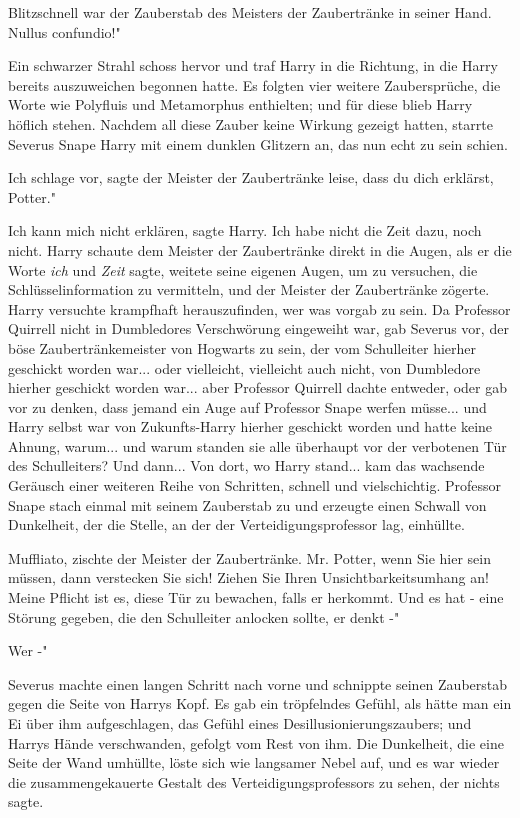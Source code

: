 Blitzschnell war der Zauberstab des Meisters der Zaubertränke in seiner Hand.
\glqq Nullus confundio!"

Ein schwarzer Strahl schoss hervor und traf Harry in die Richtung, in die Harry
bereits auszuweichen begonnen hatte. Es folgten vier weitere Zaubersprüche, die
Worte wie Polyfluis und Metamorphus enthielten; und für diese blieb Harry
höflich stehen. Nachdem all diese Zauber keine Wirkung gezeigt hatten, starrte
Severus Snape Harry mit einem dunklen Glitzern an, das nun echt zu sein schien.

\glqq Ich schlage vor\grqq{}, sagte der Meister der Zaubertränke leise, \glqq
dass du dich erklärst, Potter."

\glqq Ich kann mich nicht erklären\grqq{}, sagte Harry. \glqq Ich habe nicht die
Zeit dazu, noch nicht.\grqq{} Harry schaute dem Meister der Zaubertränke direkt
in die Augen, als er die Worte \glqq \emph{ich}\grqq{} und \glqq
\emph{Zeit}\grqq{} sagte, weitete seine eigenen Augen, um zu versuchen, die
Schlüsselinformation zu vermitteln, und der Meister der Zaubertränke zögerte.
Harry versuchte krampfhaft herauszufinden, wer was vorgab zu sein. Da Professor
Quirrell nicht in Dumbledores Verschwörung eingeweiht war, gab Severus vor, der
böse Zaubertränkemeister von Hogwarts zu sein, der vom Schulleiter hierher
geschickt worden war... oder vielleicht, vielleicht auch nicht, von Dumbledore
hierher geschickt worden war... aber Professor Quirrell dachte entweder, oder
gab vor zu denken, dass jemand ein Auge auf Professor Snape werfen müsse... und
Harry selbst war von Zukunfts-Harry hierher geschickt worden und hatte keine
Ahnung, warum... und warum standen sie alle überhaupt vor der verbotenen Tür des
Schulleiters? Und dann... Von dort, wo Harry stand... kam das wachsende Geräusch
einer weiteren Reihe von Schritten, schnell und vielschichtig. Professor Snape
stach einmal mit seinem Zauberstab zu und erzeugte einen Schwall von Dunkelheit,
der die Stelle, an der der Verteidigungsprofessor lag, einhüllte.

\glqq Muffliato\grqq{}, zischte der Meister der Zaubertränke. \glqq Mr. Potter,
wenn Sie hier sein müssen, dann verstecken Sie sich! Ziehen Sie Ihren
Unsichtbarkeitsumhang an! Meine Pflicht ist es, diese Tür zu bewachen, falls er
herkommt. Und es hat - eine Störung gegeben, die den Schulleiter anlocken
sollte, er denkt -"

\glqq Wer -"

Severus machte einen langen Schritt nach vorne und schnippte seinen Zauberstab
gegen die Seite von Harrys Kopf. Es gab ein tröpfelndes Gefühl, als hätte man
ein Ei über ihm aufgeschlagen, das Gefühl eines Desillusionierungszaubers; und
Harrys Hände verschwanden, gefolgt vom Rest von ihm. Die Dunkelheit, die eine
Seite der Wand umhüllte, löste sich wie langsamer Nebel auf, und es war wieder
die zusammengekauerte Gestalt des Verteidigungsprofessors zu sehen, der nichts
sagte.

